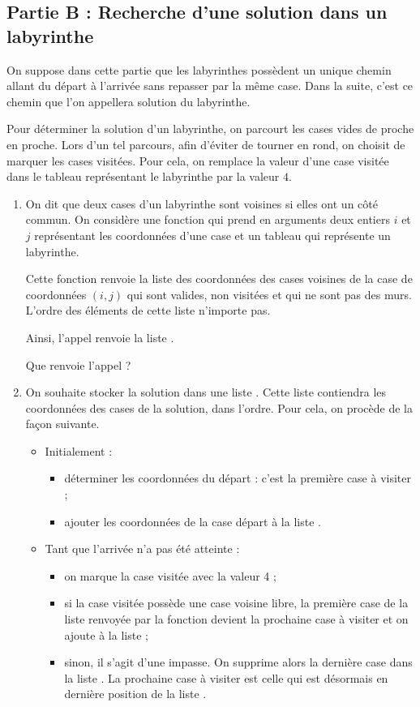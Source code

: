 \documentclass[11pt,a4paper,french,twoside]{PMCours}
\begin{document}
\subsection*{Partie B : Recherche d'une solution dans un labyrinthe}
On suppose dans cette partie que les labyrinthes possèdent un unique chemin allant du départ
à l'arrivée sans repasser par la même case. Dans la suite, c'est ce chemin que l'on appellera
solution du labyrinthe.

Pour déterminer la solution d'un labyrinthe, on parcourt les cases vides de proche en proche.
Lors d'un tel parcours, afin d'éviter de tourner en rond, on choisit de marquer les cases visitées.
Pour cela, on remplace la valeur d'une case visitée dans le tableau représentant le labyrinthe
par la valeur $4$.
\begin{enumerate}
\item On dit que deux cases d'un labyrinthe sont voisines si elles ont un côté commun.
On considère une fonction  qui prend en arguments deux entiers $i$
et $j$ représentant les coordonnées d'une case et un tableau  qui représente un labyrinthe.

Cette fonction renvoie la liste des coordonnées des cases voisines de la case de
coordonnées $(i,j)$ qui sont valides, non visitées et qui ne sont pas des murs. L'ordre des
éléments de cette liste n'importe pas.

Ainsi, l'appel  renvoie la
liste \code{[(2, 1), (1, 2)]}.

Que renvoie l'appel  ?
\item On souhaite stocker la solution dans une liste . Cette liste contiendra les
coordonnées des cases de la solution, dans l'ordre. Pour cela, on procède de la façon
suivante.
\begin{itemize}
\item Initialement :
\begin{itemize}
\item déterminer les coordonnées du départ : c'est la première case à visiter ;
\item ajouter les coordonnées de la case départ à la liste .
\end{itemize}
\item Tant que l'arrivée n'a pas été atteinte :
\begin{itemize}
\item on marque la case visitée avec la valeur 4 ;
\item si la case visitée possède une case voisine libre, la première case de la liste
renvoyée par la fonction  devient la prochaine case à visiter et on
ajoute à la liste  ;
\item sinon, il s'agit d'une impasse. On supprime alors la dernière case dans la liste
. La prochaine case à visiter est celle qui est désormais en dernière
position de la liste .
\end{itemize}
\end{itemize}


\end{enumerate}
\end{document}

